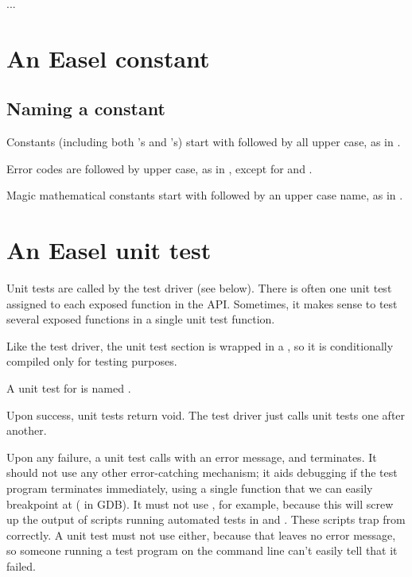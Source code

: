...



\section{An Easel constant}

 \subsection{Naming a constant}

Constants (including both 's and 's) start
with  followed by all upper case, as in
.

Error codes are  followed by upper case, as in
, except for  and .

Magic mathematical constants start with  followed by
an upper case name, as in .




\section{An Easel unit test}

Unit tests are called by the test driver (see below). There is often
one unit test assigned to each exposed function in the API. Sometimes,
it makes sense to test several exposed functions in a single unit test
function. 

Like the test driver, the unit test section is wrapped in a
, so it is conditionally compiled only
for testing purposes.

A unit test for  is named . 

Upon success, unit tests return void. The test driver just calls 
unit tests one after another.

Upon any failure, a unit test calls  with an error
message, and terminates. It should not use any other error-catching
mechanism; it aids debugging if the test program terminates
immediately, using a single function that we can easily breakpoint at
( in GDB). It must not use ,
for example, because this will screw up the output of scripts running
automated tests in  and . These
scripts trap  from  correctly.  A
unit test must not use  either, because that leaves no
error message, so someone running a test program on the command line
can't easily tell that it failed.

